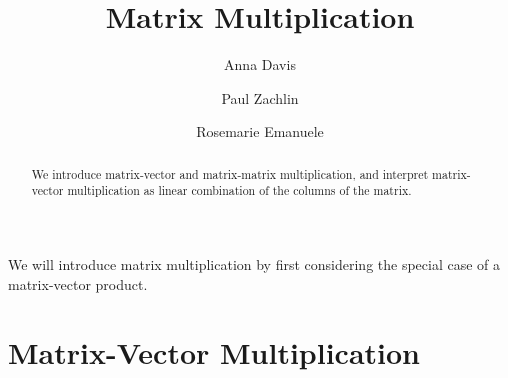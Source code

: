 \documentclass{ximera}
\author{Anna Davis \and Paul Zachlin \and Rosemarie Emanuele} \title{Matrix Multiplication} \license{CC-BY 4.0}
\begin{document}
\begin{abstract}
  We introduce matrix-vector and matrix-matrix multiplication, and interpret matrix-vector multiplication as linear combination of the columns of the matrix.
\end{abstract}
\maketitle


We will introduce matrix multiplication by first considering the special case of a matrix-vector product.

\section*{Matrix-Vector Multiplication}
\end{document}
